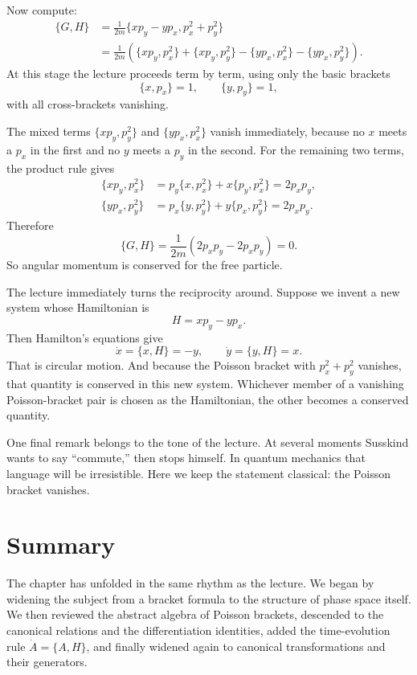 Now compute:
\begin{align}
\{G,H\}
&=\frac{1}{2m}\{xp_y-yp_x,p_x^2+p_y^2\} \\
&=\frac{1}{2m}\left(
\{xp_y,p_x^2\}
+\{xp_y,p_y^2\}
-\{yp_x,p_x^2\}
-\{yp_x,p_y^2\}
\right).
\end{align}
At this stage the lecture proceeds term by term, using only the basic brackets
\[
\{x,p_x\}=1,\qquad \{y,p_y\}=1,
\]
with all cross-brackets vanishing.

The mixed terms \(\{xp_y,p_y^2\}\) and \(\{yp_x,p_x^2\}\) vanish immediately, because no \(x\) meets a \(p_x\) in the first and no \(y\) meets a \(p_y\) in the second. For the remaining two terms, the product rule gives
\begin{align}
\{xp_y,p_x^2\}
&=p_y\{x,p_x^2\}+x\{p_y,p_x^2\}
=2p_xp_y, \\
\{yp_x,p_y^2\}
&=p_x\{y,p_y^2\}+y\{p_x,p_y^2\}
=2p_xp_y.
\end{align}
Therefore
\begin{equation}
\{G,H\}
=\frac{1}{2m}\left(2p_xp_y-2p_xp_y\right)=0.
\end{equation}
So angular momentum is conserved for the free particle.

The lecture immediately turns the reciprocity around. Suppose we invent a new system whose Hamiltonian is
\begin{equation}
H=xp_y-yp_x.
\end{equation}
Then Hamilton's equations give
\begin{equation}
\dot x=\{x,H\}=-y,\qquad \dot y=\{y,H\}=x.
\end{equation}
That is circular motion. And because the Poisson bracket with \(p_x^2+p_y^2\) vanishes, that quantity is conserved in this new system. Whichever member of a vanishing Poisson-bracket pair is chosen as the Hamiltonian, the other becomes a conserved quantity.

One final remark belongs to the tone of the lecture. At several moments Susskind wants to say ``commute,'' then stops himself. In quantum mechanics that language will be irresistible. Here we keep the statement classical: the Poisson bracket vanishes.

\section{Summary}

The chapter has unfolded in the same rhythm as the lecture. We began by widening the subject from a bracket formula to the structure of phase space itself. We then reviewed the abstract algebra of Poisson brackets, descended to the canonical relations and the differentiation identities, added the time-evolution rule \(\dot A=\{A,H\}\), and finally widened again to canonical transformations and their generators.

